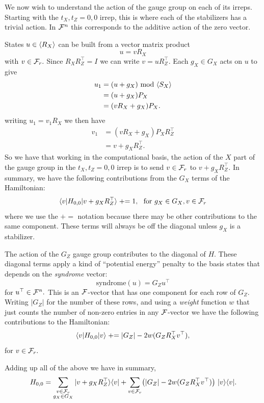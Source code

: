 We now wish to understand the action of the
gauge group on each of its irreps.
Starting with the $t_X,t_Z=0,0$ irrep,
this is where each of the stabilizers has
a trivial action. 
In $\mathcal{F}^n$ this
corresponds to the additive action of the zero vector.

\newcommand{\pluseq}{\mathrel{+}=}
States $u\in\langle R_X \rangle$ can be built from a
vector matrix product
$$
    u = v R_X
$$
with $v\in\mathcal{F}_{r}.$
Since $R_X R_Z^\top = I$
we can write $v = u R_Z^\top.$
Each $g_X\in G_X$ acts on $u$ to give
\begin{align*}
    u_1 &= (u + g_X) \ \mbox{mod}\ \langle S_X \rangle \\
        &= (u + g_X) P_X \\
        &= (v R_X + g_X) P_X.
\end{align*}
writing $u_1 = v_1 R_X$ we then have
\begin{align*}
    v_1 &= (v R_X + g_X) P_X R_Z^\top \\
        &= v + g_X R_Z^\top.
\end{align*}
So we have that working in the computational
basis, the action of the $X$ part of the
gauge group in the $t_X,t_Z=0,0$ irrep is to send
$v\in \mathcal{F}_{r}$ to $v + g_X R_Z^\top.$
In summary, we have the following contributions from the
$G_X$ terms of the Hamiltonian:
$$
    \bra{v} H_{0,0} \ket{v+g_X  R_Z^\top} 
        \pluseq 1,\ \ \mbox{for}\ g_X\in G_X, v\in \Frd
$$
where we use the $\pluseq$ notation
because there may be other contributions to the
same component.
These terms will always be off
the diagonal unless $g_X$ is a stabilizer.

The action of the $G_Z$ gauge group
contributes to the diagonal of $H.$
These diagonal terms apply a kind of
``potential energy'' penalty
to the basis states
that depends on the \emph{syndrome} vector:
$$
    \mbox{syndrome}(u) = G_Z u^\top
$$
for $u^\top \in \mathcal{F}^n.$
This is an $\mathcal{F}$-vector that has one component for
each row of $G_Z.$
Writing $|G_Z|$ for the number of these rows, and 
using a \emph{weight} function $w$ that just counts
the number of non-zero entries in any $\mathcal{F}$-vector
we have the following contributions to
the Hamiltonian:
$$
    \bra{v} H_{0,0} \ket{v} 
        \pluseq |G_Z| - 2w(G_Z R_X^\top v^\top),
$$
for $v\in \mathcal{F}_{r}.$

Adding up all of the above we
have in summary,
$$
H_{0,0} = \sum_{\substack{v\in\mathcal{F}_{r}\\g_X\in G_X } }
  |{v+g_X  R_Z^\top}\rangle\langle{v}| 
  + \sum_{v\in\mathcal{F}_{r}} \bigl(|G_Z| - 2w(G_Z R_X^\top v^\top)
    \bigr) \ |{v}\rangle\langle{v}|.
$$

